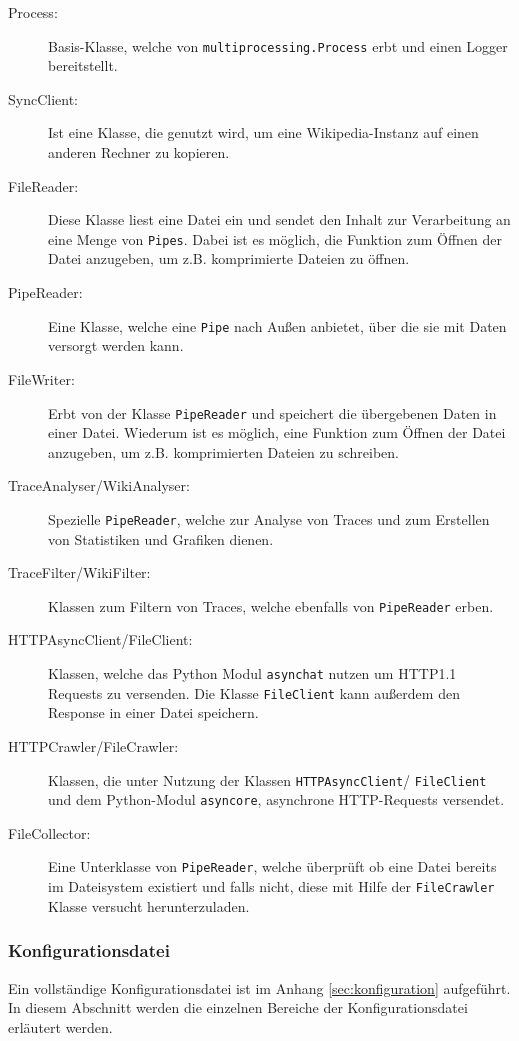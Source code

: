 \begin{description}
\item[Process:] Basis-Klasse, welche von \texttt{multiprocessing.Process} erbt und einen Logger bereitstellt.
\item[SyncClient:] Ist eine Klasse, die genutzt wird, um eine Wikipedia-Instanz auf einen anderen Rechner zu kopieren.
\item[FileReader:] Diese Klasse liest eine Datei ein und sendet den Inhalt zur Verarbeitung an eine Menge von \texttt{Pipes}. Dabei ist es möglich, die Funktion zum Öffnen der Datei anzugeben, um z.B. komprimierte Dateien zu öffnen.
\item[PipeReader:] Eine Klasse, welche eine \texttt{Pipe} nach Außen anbietet, über die sie mit Daten versorgt werden kann.
\item[FileWriter:] Erbt von der Klasse \texttt{PipeReader} und speichert die übergebenen Daten in einer Datei. Wiederum ist es möglich, eine Funktion zum Öffnen der Datei anzugeben, um z.B. komprimierten Dateien zu schreiben.
\item[TraceAnalyser/WikiAnalyser:] Spezielle \texttt{PipeReader}, welche zur Analyse von Traces und zum Erstellen von Statistiken und Grafiken dienen.
\item[TraceFilter/WikiFilter:] Klassen zum Filtern von Traces, welche ebenfalls von \texttt{PipeReader} erben.
\item[HTTPAsyncClient/FileClient:] Klassen, welche das Python Modul \texttt{asynchat} nutzen um HTTP1.1 Requests zu versenden. Die Klasse \texttt{FileClient} kann außerdem den Response in einer Datei speichern.
\item[HTTPCrawler/FileCrawler:] Klassen, die unter Nutzung der Klassen \texttt{HTTPAsyncClient}/ \texttt{FileClient} und dem Python-Modul \texttt{asyncore}, asynchrone HTTP-Requests versendet.
\item[FileCollector:] Eine Unterklasse von \texttt{PipeReader}, welche überprüft ob eine Datei bereits im Dateisystem existiert und falls nicht, diese mit Hilfe der \texttt{FileCrawler} Klasse versucht herunterzuladen.
\end{description}

\subsubsection{Konfigurationsdatei}
\label{sec:konfigurationsdatei}

Ein vollständige Konfigurationsdatei ist im Anhang \ref{sec:konfiguration} aufgeführt. In diesem Abschnitt werden die einzelnen Bereiche der Konfigurationsdatei erläutert werden.

